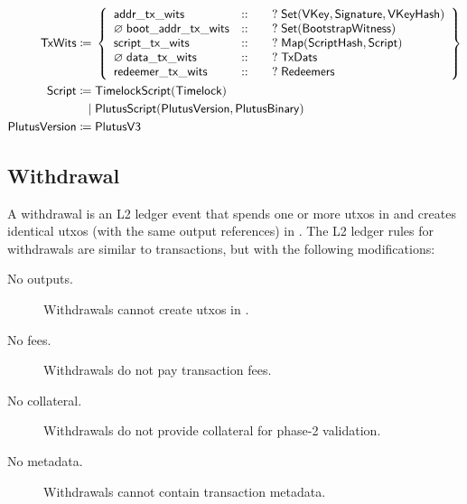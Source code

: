 \documentclass[../hydrozoa.tex]{subfiles}
\begin{document}
\begin{align*}
    \mathsf{TxWits} \coloneq\;& \left\{
    \begin{array}{lll}
      \mathsf{addr\_tx\_wits} &::& \quad?\;\mathsf{Set(VKey, Signature, VKeyHash)} \\
        \varnothing\;\mathsf{boot\_addr\_tx\_wits} &::& \quad?\;\mathsf{Set(BootstrapWitness)} \\
        \mathsf{script\_tx\_wits} &::& \quad?\;\mathsf{Map(ScriptHash, Script)} \\
        \varnothing\;\mathsf{data\_tx\_wits} &::& \quad?\;\mathsf{TxDats} \\
        \mathsf{redeemer\_tx\_wits} &::& \quad?\;\mathsf{Redeemers}
    \end{array} \right\}\\
    \mathsf{Script} \coloneq\;& \mathsf{TimelockScript}(\mathsf{Timelock}) \\
                          \mid\;& \mathsf{PlutusScript}(\mathsf{PlutusVersion},\mathsf{PlutusBinary}) \\
    \mathsf{PlutusVersion} \coloneq\;& \mathsf{PlutusV3}
\end{align*}
\endgroup

\subsection{Withdrawal}%
\label{h:ledger-withdrawal}

A withdrawal is an L2 ledger event that spends one or more utxos in  and creates identical utxos (with the same output references) in .
The L2 ledger rules for withdrawals are similar to transactions, but with the following modifications:
\begin{description}
  \item[No outputs.] Withdrawals cannot create utxos in .
  \item[No fees.] Withdrawals do not pay transaction fees.
  \item[No collateral.] Withdrawals do not provide collateral for phase-2 validation.
  \item[No metadata.] Withdrawals cannot contain transaction metadata.
\end{description}
\end{document}
